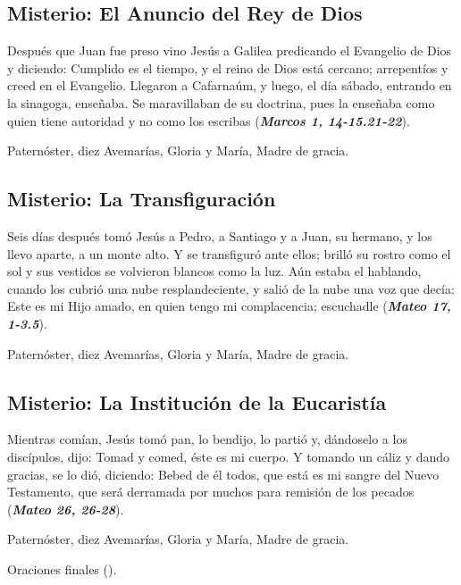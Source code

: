 \documentclass[./main.tex]{subfiles}
\newcounter{lux-counter}
\begin{document}
\subsection*{ Misterio: El Anuncio del Rey de Dios}
Después que Juan fue preso vino Jesús a Galilea predicando el Evangelio de Dios y diciendo: Cumplido es el tiempo, 
y el reino de Dios está cercano; arrepentíos y creed en el Evangelio. Llegaron a Cafarnaúm, y luego, el día sábado, 
entrando en la sinagoga, enseñaba. Se maravillaban de su doctrina, pues la enseñaba como quien tiene autoridad y 
no como los escribas (\textbf{\emph{Marcos 1, 14-15.21-22}}).

\begin{center}
      Paternóster, diez Avemarías, Gloria y María, Madre de gracia.
\end{center}

\subsection*{ Misterio: La Transfiguración}
Seis días después tomó Jesús a Pedro, a Santiago y a Juan, su hermano, y los llevo aparte, a un monte alto. 
Y se transfiguró ante ellos; brilló su rostro como el sol y sus vestidos se volvieron blancos como la luz. Aún estaba el hablando, 
cuando los cubrió una nube resplandeciente, y salió de la nube una voz que decía: Este es mi Hijo amado, 
en quien tengo mi complacencia; escuchadle (\textbf{\emph{Mateo 17, 1-3.5}}).

\begin{center}
      Paternóster, diez Avemarías, Gloria y María, Madre de gracia.
\end{center}

\subsection*{ Misterio: La Institución de la Eucaristía}
Mientras comían, Jesús tomó pan, lo bendijo, lo partió y, dándoselo a los discípulos, dijo: Tomad y comed, éste es mi cuerpo. 
Y tomando un cáliz y dando gracias, se lo dió, diciendo: Bebed de él todos, que está es mi sangre del Nuevo Testamento, 
que será derramada por muchos para remisión de los pecados (\textbf{\emph{Mateo 26, 26-28}}).

\begin{center}
      Paternóster, diez Avemarías, Gloria y María, Madre de gracia.
      
      Oraciones finales ().
\end{center}
\end{document}
